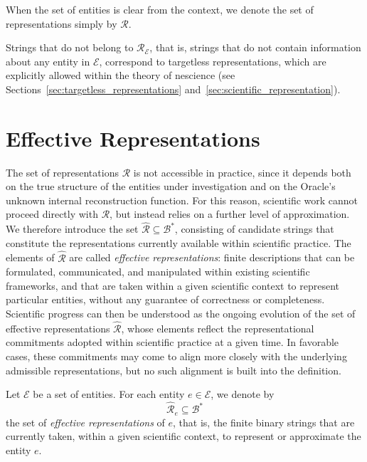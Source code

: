 \begin{notation}
When the set of entities is clear from the context, we denote the set of representations simply by $\mathcal{R}$.
\end{notation}

Strings that do not belong to $\mathcal{R}_{\mathcal{E}}$, that is, strings that do not contain information about any entity in $\mathcal{E}$, correspond to targetless representations, which are explicitly allowed within the theory of nescience (see Sections~\ref{sec:targetless_representations} and~\ref{sec:scientific_representation}).

%
%

\section{Effective Representations}

The set of representations $\mathcal{R}$ is not accessible in practice, since it depends both on the true structure of the entities under investigation and on the Oracle's unknown internal reconstruction function. For this reason, scientific work cannot proceed directly with $\mathcal{R}$, but instead relies on a further level of approximation. We therefore introduce the set $\hat{\mathcal{R}} \subseteq \mathcal{B}^\ast$, consisting of candidate strings that constitute the representations currently available within scientific practice. The elements of $\hat{\mathcal{R}}$ are called \emph{effective representations}: finite descriptions that can be formulated, communicated, and manipulated within existing scientific frameworks, and that are taken within a given scientific context to represent particular entities, without any guarantee of correctness or completeness. Scientific progress can then be understood as the ongoing evolution of the set of effective representations $\hat{\mathcal{R}}$, whose elements reflect the representational commitments adopted within scientific practice at a given time. In favorable cases, these commitments may come to align more closely with the underlying admissible representations, but no such alignment is built into the definition.

\begin{definition}
Let $\mathcal{E}$ be a set of entities. For each entity $e \in \mathcal{E}$, we denote by
\[
\hat{\mathcal{R}}_{e} \subseteq \mathcal{B}^\ast
\]
the set of \emph{effective representations} of $e$, that is, the finite binary strings that are currently taken, within a given scientific context, to represent or approximate the entity $e$.
\end{definition}

